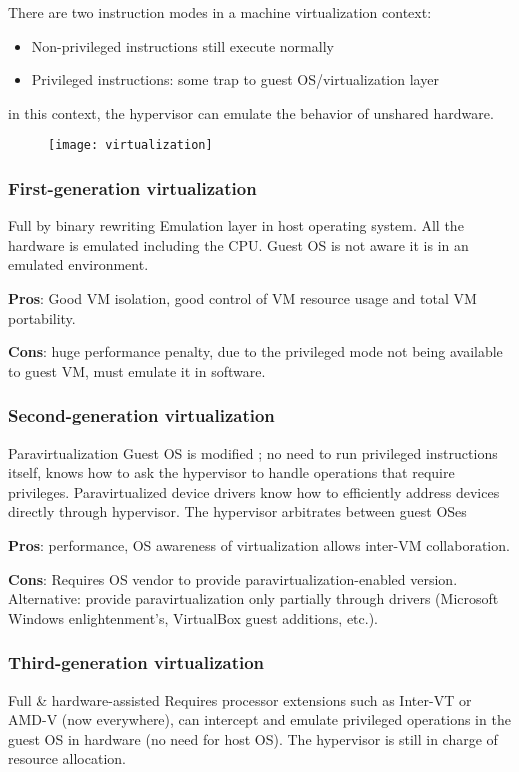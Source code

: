 There are two instruction modes in a machine virtualization context:
\begin{itemize}
    \item Non-privileged instructions still execute normally
    \item Privileged instructions: some trap to guest OS/virtualization layer
\end{itemize}

in this context, the hypervisor can emulate the behavior of unshared hardware.

\begin{figure}[H]
    \centering
    \texttt{[image: virtualization]}
\end{figure}

\subsubsection{First-generation virtualization}
Full by binary rewriting Emulation layer in host operating system. All the hardware is emulated including the CPU. Guest OS is not aware it is in an emulated environment.

\textbf{Pros}: Good VM isolation, good control of VM resource usage and total VM portability.

\textbf{Cons}: huge performance penalty, due to the privileged mode not being available to guest VM, must emulate it in software.

\subsubsection{Second-generation virtualization}
Paravirtualization Guest OS is modified ; no need to run privileged instructions itself, knows how to ask the hypervisor to handle operations that require privileges. Paravirtualized device drivers know how to efficiently address devices directly through hypervisor.
The hypervisor arbitrates between guest OSes

\textbf{Pros}: performance, OS awareness of virtualization allows inter-VM collaboration.

\textbf{Cons}: Requires OS vendor to provide paravirtualization-enabled version. Alternative: provide paravirtualization only partially through drivers (Microsoft Windows enlightenment’s, VirtualBox guest additions, etc.).

\subsubsection{Third-generation virtualization}
Full \& hardware-assisted Requires processor extensions such as Inter-VT or AMD-V (now everywhere), can intercept and emulate privileged operations in the guest OS in hardware (no need for host OS). The hypervisor is still in charge of resource allocation.

